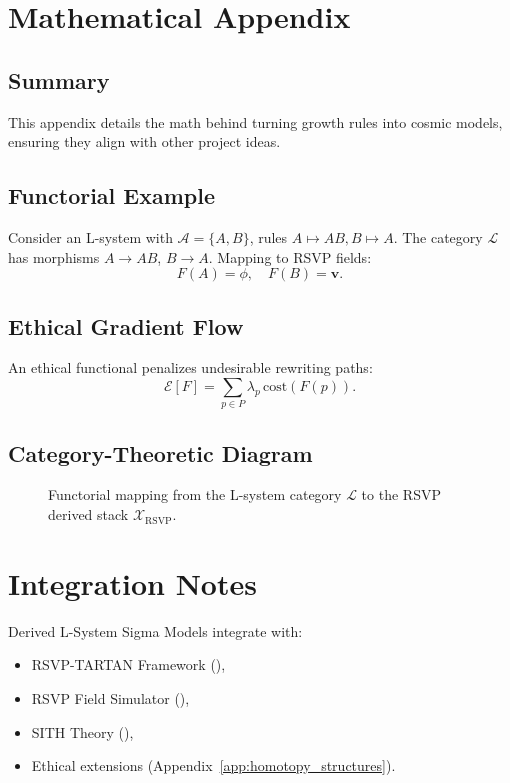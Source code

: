 \documentclass[11pt,oneside]{memoir}
\theoremstyle{plain}
\newcommand{\X}{\mathcal{X}}
\newcommand{\A}{\mathcal{A}}
\newcommand{\Lcal}{\mathcal{L}} %
\begin{document}
\section{Mathematical Appendix}
\subsection{Summary}
This appendix details the math behind turning growth rules into cosmic models, ensuring they align with other project ideas.

\subsection{Functorial Example}
Consider an L-system with \(\A = \{A,B\}\), rules \(A \mapsto AB, B \mapsto A\). The category \(\Lcal\) has morphisms \(A \to AB\), \(B \to A\). Mapping to RSVP fields:
\begin{equation}
    F(A) = \phi, \quad F(B) = \mathbf{v}.
\end{equation}

\subsection{Ethical Gradient Flow}
An ethical functional penalizes undesirable rewriting paths:
\begin{equation}
    \mathcal{E}[F] = \sum_{p \in P} \lambda_p \, \mathrm{cost}(F(p)).
\end{equation}

\subsection{Category-Theoretic Diagram}
\begin{figure}[h]
    \centering
    \caption{Functorial mapping from the L-system category \(\Lcal\) to the RSVP derived stack \(\X_{\mathrm{RSVP}}\).}
    \label{fig:l_system_functor}
\end{figure}

\section{Integration Notes}
Derived L-System Sigma Models integrate with:
\begin{itemize}
    \item RSVP-TARTAN Framework (),
    \item RSVP Field Simulator (),
    \item SITH Theory (),
    \item Ethical extensions (Appendix~\ref{app:homotopy_structures}).
\end{itemize}
\end{document}
